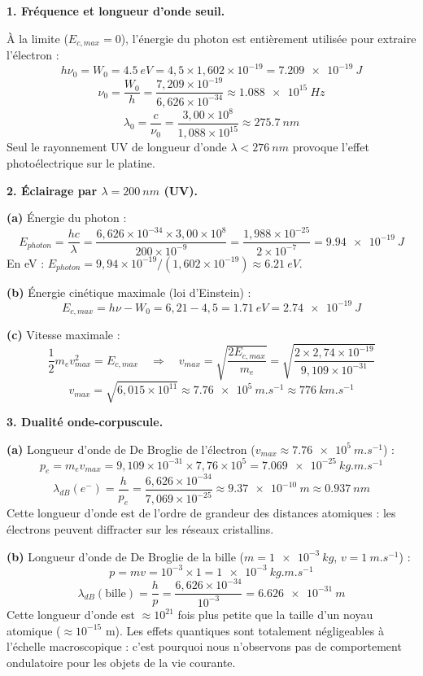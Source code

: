\documentclass[12pt,a4paper]{article}
\begin{document}
\begin{boitecorrige}
\textbf{1. Fréquence et longueur d'onde seuil.}

À la limite ($E_{c,max} = 0$), l'énergie du photon est entièrement utilisée pour extraire l'électron :
\[
h\nu_0 = W_0 = \qty{4.5}{eV} = 4{,}5\times1{,}602\times10^{-19} = \qty{7.209e-19}{J}
\]
\[
\nu_0 = \frac{W_0}{h} = \frac{7{,}209\times10^{-19}}{6{,}626\times10^{-34}} \approx \qty{1.088e15}{Hz}
\]
\[
\lambda_0 = \frac{c}{\nu_0} = \frac{3{,}00\times10^8}{1{,}088\times10^{15}} \approx \qty{275.7}{nm}
\]
Seul le rayonnement UV de longueur d'onde $\lambda < \qty{276}{nm}$ provoque l'effet photoélectrique sur le platine.

\textbf{2. Éclairage par $\lambda = \qty{200}{nm}$ (UV).}

\textbf{(a)} Énergie du photon :
\[
E_{photon} = \frac{hc}{\lambda} = \frac{6{,}626\times10^{-34}\times3{,}00\times10^8}{200\times10^{-9}} = \frac{1{,}988\times10^{-25}}{2\times10^{-7}} = \qty{9.94e-19}{J}
\]
En eV : $E_{photon} = 9{,}94\times10^{-19}/(1{,}602\times10^{-19}) \approx \qty{6.21}{eV}$.

\textbf{(b)} Énergie cinétique maximale (loi d'Einstein) :
\[
E_{c,max} = h\nu - W_0 = 6{,}21 - 4{,}5 = \qty{1.71}{eV} = \qty{2.74e-19}{J}
\]

\textbf{(c)} Vitesse maximale :
\[
\frac{1}{2}m_e v_{max}^2 = E_{c,max} \quad \Rightarrow \quad v_{max} = \sqrt{\frac{2E_{c,max}}{m_e}} = \sqrt{\frac{2\times2{,}74\times10^{-19}}{9{,}109\times10^{-31}}}
\]
\[
v_{max} = \sqrt{6{,}015\times10^{11}} \approx \qty{7.76e5}{m.s^{-1}} \approx \qty{776}{km.s^{-1}}
\]

\textbf{3. Dualité onde-corpuscule.}

\textbf{(a)} Longueur d'onde de De Broglie de l'électron ($v_{max} \approx \qty{7.76e5}{m.s^{-1}}$) :
\[
p_e = m_e v_{max} = 9{,}109\times10^{-31}\times7{,}76\times10^5 = \qty{7.069e-25}{kg.m.s^{-1}}
\]
\[
\lambda_{dB}(e^-) = \frac{h}{p_e} = \frac{6{,}626\times10^{-34}}{7{,}069\times10^{-25}} \approx \qty{9.37e-10}{m} \approx \qty{0.937}{nm}
\]
Cette longueur d'onde est de l'ordre de grandeur des distances atomiques : les électrons peuvent diffracter sur les réseaux cristallins.

\textbf{(b)} Longueur d'onde de De Broglie de la bille ($m = \qty{1e-3}{kg}$, $v = \qty{1}{m.s^{-1}}$) :
\[
p = mv = 10^{-3}\times1 = \qty{1e-3}{kg.m.s^{-1}}
\]
\[
\lambda_{dB}(\text{bille}) = \frac{h}{p} = \frac{6{,}626\times10^{-34}}{10^{-3}} = \qty{6.626e-31}{m}
\]
Cette longueur d'onde est $\approx 10^{21}$ fois plus petite que la taille d'un noyau atomique ($\approx 10^{-15}$ m). Les effets quantiques sont totalement négligeables à l'échelle macroscopique : c'est pourquoi nous n'observons pas de comportement ondulatoire pour les objets de la vie courante.


\end{boitecorrige}
\end{document}
